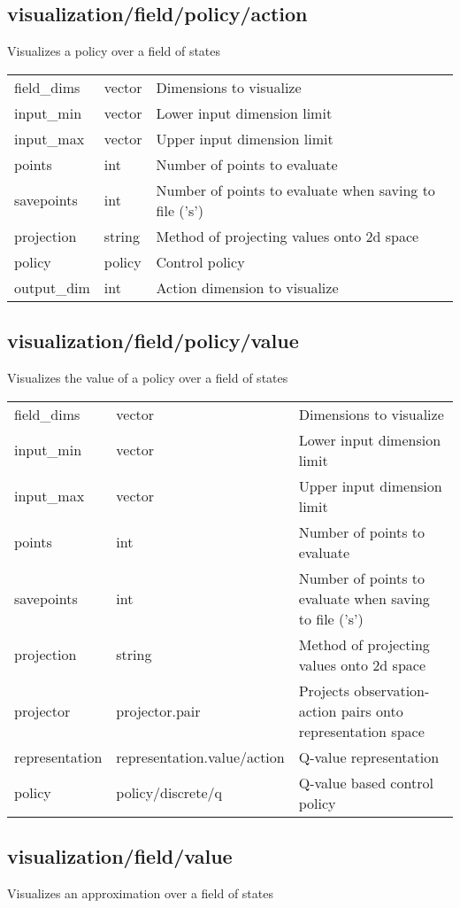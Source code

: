 \subsection{visualization/field/policy/action}
\noindent Visualizes a policy over a field of states\\

\noindent\begin{tabular}{@{}lll@{}}
field\_dims&vector&Dimensions to visualize\\
input\_min&vector&Lower input dimension limit\\
input\_max&vector&Upper input dimension limit\\
points&int&Number of points to evaluate\\
savepoints&int&Number of points to evaluate when saving to file ('s')\\
projection&string&Method of projecting values onto 2d space\\
policy&policy&Control policy\\
output\_dim&int&Action dimension to visualize\\
\end{tabular}
\subsection{visualization/field/policy/value}
\noindent Visualizes the value of a policy over a field of states\\

\noindent\begin{tabular}{@{}lll@{}}
field\_dims&vector&Dimensions to visualize\\
input\_min&vector&Lower input dimension limit\\
input\_max&vector&Upper input dimension limit\\
points&int&Number of points to evaluate\\
savepoints&int&Number of points to evaluate when saving to file ('s')\\
projection&string&Method of projecting values onto 2d space\\
projector&projector.pair&Projects observation-action pairs onto representation space\\
representation&representation.value/action&Q-value representation\\
policy&policy/discrete/q&Q-value based control policy\\
\end{tabular}
\subsection{visualization/field/value}
\noindent Visualizes an approximation over a field of states\\

